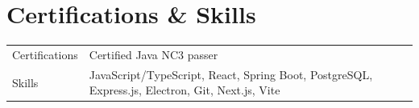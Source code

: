 \documentclass[a4paper,12pt]{article}
\begin{document}
\section{Certifications \& Skills}
\begin{tabularx}{\linewidth}{@{}l X@{}}
Certifications &  \normalsize{Certified Java NC3 passer}\\
Skills  &  \normalsize{JavaScript/TypeScript, React, Spring Boot, PostgreSQL, Express.js, Electron, Git, Next.js, Vite}\\  
\end{tabularx}

\vfill
{}
\end{document}
